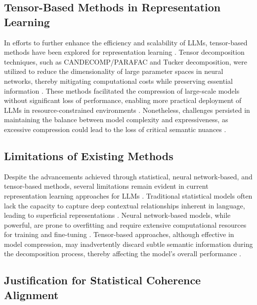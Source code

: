 \documentclass{article}
\begin{document}
\subsection{Tensor-Based Methods in Representation Learning}

In efforts to further enhance the efficiency and scalability of LLMs, tensor-based methods have been explored for representation learning \cite{tsuruta2024investigating}. Tensor decomposition techniques, such as CANDECOMP/PARAFAC and Tucker decomposition, were utilized to reduce the dimensionality of large parameter spaces in neural networks, thereby mitigating computational costs while preserving essential information \cite{rateri2024automated, rixewa2024interleaved}. These methods facilitated the compression of large-scale models without significant loss of performance, enabling more practical deployment of LLMs in resource-constrained environments \cite{mcintosh2024reasoning}. Nonetheless, challenges persisted in maintaining the balance between model complexity and expressiveness, as excessive compression could lead to the loss of critical semantic nuances \cite{men2024large,aturd2024dynamic}.

\subsection{Limitations of Existing Methods}

Despite the advancements achieved through statistical, neural network-based, and tensor-based methods, several limitations remain evident in current representation learning approaches for LLMs \cite{hawks2024neural}. Traditional statistical models often lack the capacity to capture deep contextual relationships inherent in language, leading to superficial representations \cite{penicig2024assessing}. Neural network-based models, while powerful, are prone to overfitting and require extensive computational resources for training and fine-tuning \cite{hisaharo2024optimizing,chard2024auditing}. Tensor-based approaches, although effective in model compression, may inadvertently discard subtle semantic information during the decomposition process, thereby affecting the model's overall performance \cite{alouris2024dynamic}.

\subsection{Justification for Statistical Coherence Alignment}
\end{document}
